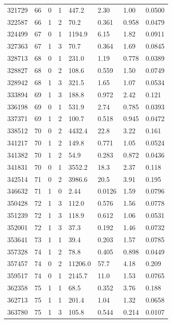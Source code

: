 \documentclass[preview]{standalone}
\begin{document}
{{{{{{\begin{tabular}{L{1.2cm}C{1.2cm} C{0.3cm}C{0.5cm} C{1.4cm}C{1.4cm} C{1.4cm}C{1.4cm}}
  321729  &    66  & 0     &  1 &  447.2  & 2.30  & 1.00 &  0.0500   \\ 
  322587  &    66  & 1     &  2 &  70.2  & 0.361  & 0.958 &  0.0479   \\ 
  324499  &    67  & 0     &  1 &  1194.9  & 6.15  & 1.82 &  0.0911   \\ 
  327363  &    67  & 1     &  3 &  70.7  & 0.364  & 1.69 &  0.0845   \\ 
  328713  &    68  & 0     &  1 &  231.0  & 1.19  & 0.778 &  0.0389   \\ 
  328827  &    68  & 0     &  2 &  108.6  & 0.559  & 1.50 &  0.0749   \\ 
  328942  &    68  & 1     &  3 &  321.5  & 1.65  & 1.07 &  0.0534   \\ 
  333894  &    69  & 1     &  3 &  188.8  & 0.972  & 2.42 &  0.121   \\ 
  336198  &    69  & 0     &  1 &  531.9  & 2.74  & 0.785 &  0.0393   \\ 
  337371  &    69  & 1     &  2 &  100.7  & 0.518  & 0.945 &  0.0472   \\ 
  338512  &    70  & 0     &  2 &  4432.4  & 22.8  & 3.22 &  0.161   \\ 
  341217  &    70  & 1     &  2 &  149.8  & 0.771  & 1.05 &  0.0524   \\ 
  341382  &    70  & 1     &  2 &  54.9  & 0.283  & 0.872 &  0.0436   \\ 
  341831  &    70  & 0     &  1 &  3552.2  & 18.3  & 2.37 &  0.118   \\ 
  342514  &    71  & 0     &  2 &  3986.6  & 20.5  & 3.91 &  0.195   \\ 
  346632  &    71  & 1     &  0 &  2.44  & 0.0126  & 1.59 &  0.0796   \\ 
  350428  &    72  & 1     &  3 &  112.0  & 0.576  & 1.56 &  0.0778   \\ 
  351239  &    72  & 1     &  3 &  118.9  & 0.612  & 1.06 &  0.0531   \\ 
  352001  &    72  & 1     &  3 &  37.3  & 0.192  & 1.46 &  0.0732   \\ 
  353641  &    73  & 1     &  1 &  39.4  & 0.203  & 1.57 &  0.0785   \\ 
  357328  &    74  & 1     &  2 &  78.8  & 0.405  & 0.898 &  0.0449   \\ 
  357457  &    74  & 0     &  2 &  11206.0  & 57.7  & 4.18 &  0.209   \\ 
  359517  &    74  & 0     &  1 &  2145.7  & 11.0  & 1.53 &  0.0765   \\ 
  362358  &    75  & 1     &  1 &  68.5  & 0.352  & 3.76 &  0.188   \\ 
  362713  &    75  & 1     &  1 &  201.4  & 1.04  & 1.32 &  0.0658   \\ 
  363780  &    75  & 1     &  3 &  105.8  & 0.544  & 0.214 &  0.0107   \\ 
\hline 
\end{tabular} 

}}}}}}
\end{document}
